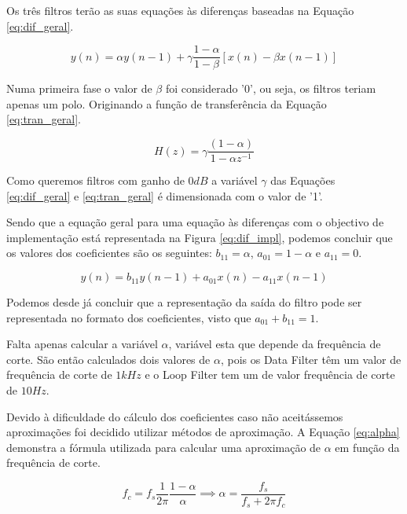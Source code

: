 \documentclass[11pt]{article}
\numberwithin{equation}{section}
\begin{document}
Os três filtros terão as suas equações às diferenças baseadas na Equação \ref{eq:dif_geral}.

\begin{equation}
y(n)=\alpha y(n-1) + \gamma \frac{1-\alpha}{1-\beta}[x(n)-\beta x(n-1)]
\label{eq:dif_geral}
\end{equation}

Numa primeira fase o valor de $ \beta $ foi considerado '0', ou seja, os filtros teriam apenas um polo. Originando a função de transferência da Equação \ref{eq:tran_geral}.

\begin{equation}
H(z)=\gamma\frac{(1-\alpha)}{1-\alpha z^{-1}}
\label{eq:tran_geral}
\end{equation}

Como queremos filtros com ganho de $ 0dB $ a variável $ \gamma $ das Equações \ref{eq:dif_geral} e \ref{eq:tran_geral} é dimensionada com o valor de '1'. 

Sendo que a equação geral para uma equação às diferenças com o objectivo de implementação está representada na Figura \ref{eq:dif_impl}, podemos concluir que os valores dos coeficientes são os seguintes: $ b_{11}=\alpha $, $ a_{01}=1-\alpha $ e $ a_{11}=0 $.

\begin{equation}
y(n)=b_{11} y(n-1) + a_{01}x(n)-a_{11}x(n-1)
\label{eq:dif_impl}
\end{equation}

Podemos desde já concluir que a representação da saída do filtro pode ser representada no formato dos coeficientes, visto que $ a_{01}+b_{11}=1 $.

Falta apenas calcular a variável $ \alpha $, variável esta que depende da frequência de corte. São então calculados dois valores de $ \alpha $, pois os Data Filter têm um valor de frequência de corte de $ 1kHz $ e o Loop Filter tem um de valor frequência de corte de $ 10Hz $.

Devido à dificuldade do cálculo dos coeficientes caso não aceitássemos aproximações foi decidido utilizar métodos de aproximação. A Equação \ref{eq:alpha} demonstra a fórmula utilizada para calcular uma aproximação de $ \alpha $ em função da frequência de corte.

\begin{equation}
f_{c}=f_{s}\frac{1}{2 \pi}\frac{1-\alpha}{\alpha} \implies \alpha=\frac{f_{s}}{f_{s} + 2 \pi f_{c}}
\label{eq:alpha}
\end{equation}
\end{document}
